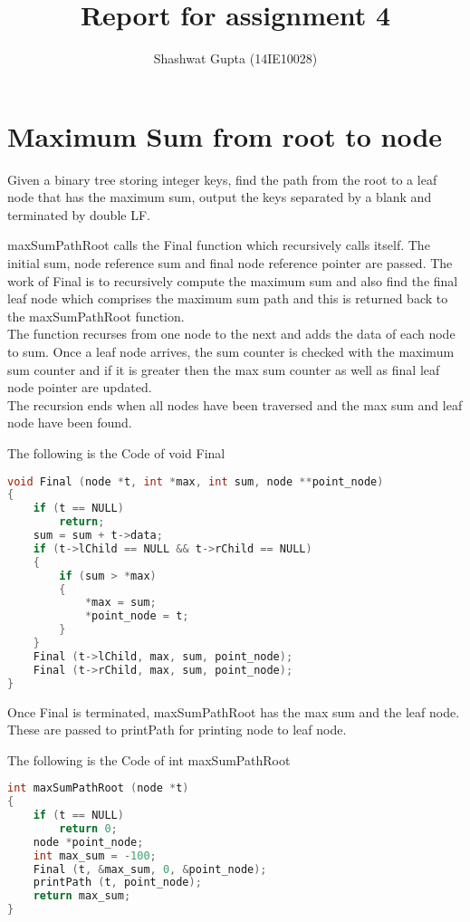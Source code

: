 \documentclass{article}
\title{Report for assignment 4}
\author{Shashwat Gupta (14IE10028)}
\begin{document}
\maketitle

\section{Maximum Sum from root to node}

Given a binary tree storing integer keys, find the path from the root to a leaf node that has the maximum sum, output the keys separated by a blank and terminated by double LF.

maxSumPathRoot calls the Final function which recursively calls itself. The initial sum, node reference sum and final node reference pointer are passed. The work of Final is to recursively compute the maximum sum and also find the final leaf node which comprises the maximum sum path and this is returned back to the maxSumPathRoot function. \\
The function recurses from one node to the next and adds the data of each node to sum. Once a leaf node arrives, the sum counter is checked with the maximum sum counter and if it is greater then the max sum counter as well as final leaf node pointer are updated. \\
The recursion ends when all nodes have been traversed and the max sum and leaf node have been found.

The following is the Code of void Final
\begin{lstlisting}[language=c, caption=elimin\_solve]
void Final (node *t, int *max, int sum, node **point_node)
{
    if (t == NULL)
        return;
    sum = sum + t->data;
    if (t->lChild == NULL && t->rChild == NULL)
    {
        if (sum > *max)
        {
            *max = sum;
            *point_node = t;
        }
    }
    Final (t->lChild, max, sum, point_node);
    Final (t->rChild, max, sum, point_node);
}
\end{lstlisting}

Once Final is terminated, maxSumPathRoot has the max sum and the leaf node. These are passed to printPath for printing node to leaf node.

The following is the Code of int maxSumPathRoot
\begin{lstlisting}[language=c, caption=elimin\_solve]
int maxSumPathRoot (node *t)
{
    if (t == NULL)
        return 0;
    node *point_node;
    int max_sum = -100;
    Final (t, &max_sum, 0, &point_node);
    printPath (t, point_node); 
    return max_sum;
}
\end{lstlisting}
\end{document}
